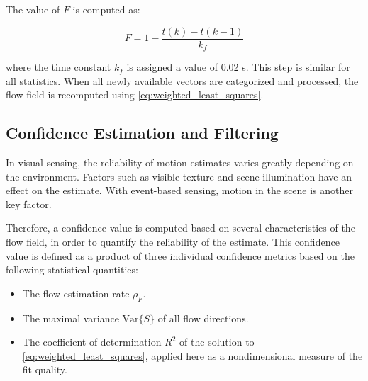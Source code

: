 The value of $F$ is computed as:

\begin{equation}
F = 1-\frac{t(k)-t(k-1)}{k_f}
\end{equation}

where the time constant $k_f$ is assigned a value of 0.02 s. This step is similar for all statistics. When all newly available vectors are categorized and processed, the flow field is recomputed using \cref{eq:weighted_least_squares}. 


%
%



\subsection{Confidence Estimation and Filtering}
\label{sec:vo_confidence}
In visual sensing, the reliability of motion estimates varies greatly depending on the environment. Factors such as visible texture and scene illumination have an effect on the estimate. With event-based sensing, motion in the scene is another key factor. 

Therefore, a confidence value is computed based on several characteristics of the flow field, in order to quantify the reliability of the estimate. This confidence value is defined as a product of three individual confidence metrics based on the following statistical quantities: 

\begin{itemize}
	\item The flow estimation rate $\rho_F$.
	\item The maximal variance $\mathrm{Var}\lbrace S\rbrace$ of all flow directions.
	\item The coefficient of determination $R^2$ of the solution to \cref{eq:weighted_least_squares}, applied here as a nondimensional measure of the fit quality.
\end{itemize}

